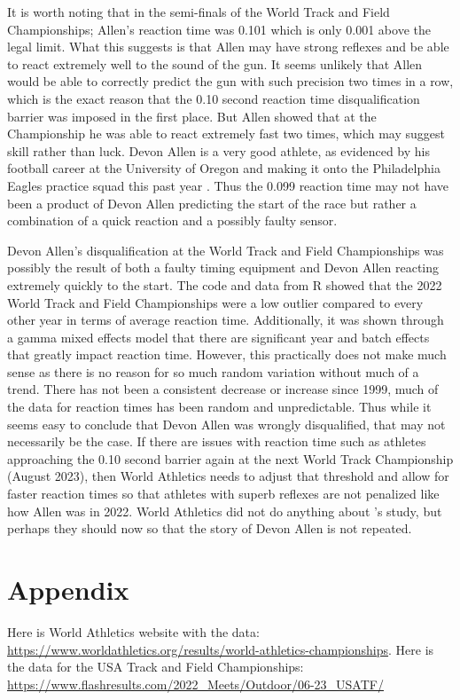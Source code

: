 \documentclass[12pt, letterpaper, titlepage]{article}
\begin{document}
It is worth noting that in the semi-finals of the World Track and
Field Championships; Allen's reaction time was 0.101 which is only 0.001 above
the legal limit.  What this suggests is that Allen may have strong reflexes
and be able to react extremely well to the sound of the gun.  It seems unlikely that
Allen would be able to correctly predict the gun with such precision two times in a row,
which is the exact reason that the 0.10 second reaction time disqualification barrier was
imposed in the first place.  But Allen showed that at the Championship he was able to
react extremely fast two times, which may suggest skill rather than luck. Devon 
Allen is a very good athlete, as evidenced by his football career at the University of Oregon
and making it onto the Philadelphia Eagles practice squad this past year \citep{Hurley}.
Thus the 0.099 reaction time may not have been a product of Devon Allen
predicting the start of the race but rather a combination of a quick reaction 
and a possibly faulty sensor.

Devon Allen's disqualification at the World Track and Field Championships was
possibly the result of both a faulty timing equipment and Devon Allen
reacting extremely quickly to the start.  The code and data from R showed that
the 2022 World Track and Field Championships were a low outlier compared to
every other year in terms of average reaction time.  Additionally, it was shown
through a gamma mixed effects model that there are significant year and batch
effects that greatly impact reaction time.  However, this practically does not make much sense
as there is no reason for so much random variation without much of a trend.
There has not been a consistent decrease or increase since 1999, much of the data
for reaction times has been random and unpredictable.  Thus while it seems easy
to conclude that Devon Allen was wrongly disqualified, that may not necessarily
be the case.  If there are issues with reaction time such as athletes approaching the 0.10 
second barrier again at the next World Track Championship (August 2023), then World Athletics 
needs to adjust that threshold and allow for faster reaction times so that athletes with superb 
reflexes are not penalized like how Allen was in 2022.  World Athletics did not
do anything about \citet{komi2009iaaf}'s study, but perhaps they should now so
that the story of Devon Allen is not repeated.



\section{Appendix}
\label{sec:Appendix}
Here is World Athletics website with the data: \url{https://www.worldathletics.org/results/world-athletics-championships}.
Here is the data for the USA Track and Field Championships: \url{https://www.flashresults.com/2022_Meets/Outdoor/06-23_USATF/}
\end{document}
